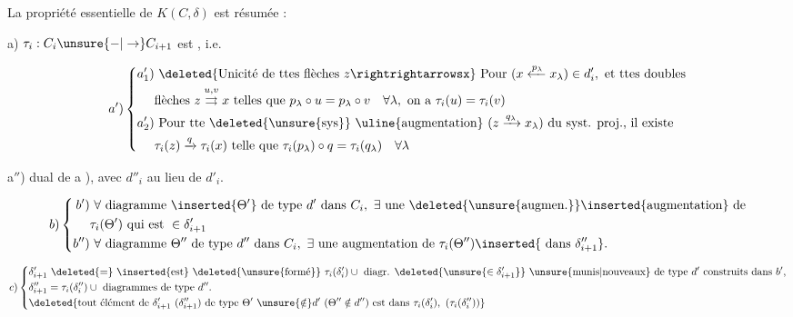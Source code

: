 
La propriété essentielle de $K(C,\delta)$  est résumée  :

a) $\tau_i:C_i\unsure{-|\to}C_{i+1}$ est  , i.e.

\[
a')\left\{\begin{aligned}
a'_1)&\ \deleted{\text{Unicité de ttes flèches }z\rightrightarrowsx}\ \text{Pour }(x\xleftarrow{p_\lambda}x_\lambda)\in d'_i,\text{ et ttes doubles}\\
&\text{flèches }z\overset{u,v}{\rightrightarrows}x\text{ telles que }p_\lambda\circ u=p_\lambda\circ v\quad\forall\lambda,\text{ on a }\tau_i(u)=\tau_i(v)\\
a'_2)&\ \text{Pour tte }\deleted{\unsure{\text{sys}}}\ \text{\uline{augmentation} }(z\xrightarrow{q_\lambda}x_\lambda)\text{ du syst. proj., il existe}\\
&\tau_i(z)\xrightarrow{q}\tau_i(x)\text{ telle que }\tau_i(p_\lambda)\circ q=\tau_i(q_\lambda)\quad\forall\lambda
\end{aligned}\right.
\]

a$''$)  dual de a ), avec $d''_i$ au lieu de $d'_i$.


\[
b)\left\{\begin{aligned}
b')&\ \forall\text{ diagramme }\inserted{\Theta'}\text{ de type }d'\text{ dans } C_i,\ \exists\text{ une }\deleted{\unsure{\text{augmen.}}}\inserted{\text{augmentation}}\text{ de}\\
&\tau_i(\Theta')\text{ qui est }\in\delta'_{i+1}\\
b'')&\ \forall\text{ diagramme }\Theta''\text{ de type }d''\text{ dans }C_i,\ \exists\text{ une augmentation de }\tau_i(\Theta'')\inserted{\text{ dans }\delta''_{i+1}}.
\end{aligned}\right.
\]

\[
c)\left\{\begin{aligned}
&\delta'_{i+1}\ \deleted{=}\ \inserted{\text{est}}\ \deleted{\unsure{\text{formé}}}\ \tau_i(\delta'_i)\cup\text{ diagr. }\deleted{\unsure{\in\delta'_{i+1}}}\text{ }\unsure{\text{munis}|\text{nouveaux}}\text{ de type }d'\text{ construits dans }b',\\
&\delta''_{i+1}=\tau_i(\delta''_i)\cup\text{ diagrammes de type }d''.\\
&\deleted{\text{tout élément de }\delta'_{i+1}\ (\delta''_{i+1})\text{ de type }\Theta'\ \unsure{\notin}d'\ (\Theta''\notin d'')\text{ est dans }\tau_i(\delta'_i),\ (\tau_i(\delta''_i))}
\end{aligned}\right.
\]

